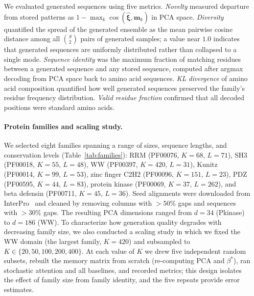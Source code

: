 We evaluated generated sequences using five metrics. \emph{Novelty} measured departure from stored patterns as $1 - \max_k \cos(\hat{\boldsymbol{\xi}}, \mathbf{m}_k)$ in PCA space. \emph{Diversity} quantified the spread of the generated ensemble as the mean pairwise cosine distance among all $\binom{S}{2}$ pairs of generated samples; a value near $1.0$ indicates that generated sequences are uniformly distributed rather than collapsed to a single mode. \emph{Sequence identity} was the maximum fraction of matching residues between a generated sequence and any stored sequence, computed after argmax decoding from PCA space back to amino acid sequences. \emph{KL divergence} of amino acid composition quantified how well generated sequences preserved the family's residue frequency distribution. \emph{Valid residue fraction} confirmed that all decoded positions were standard amino acids.

\paragraph{Protein families and scaling study.}
We selected eight families spanning a range of sizes, sequence lengths, and conservation levels (Table~\ref{tab:families}): RRM (PF00076, $K{=}68$, $L{=}71$), SH3 (PF00018, $K{=}55$, $L{=}48$), WW (PF00397, $K{=}420$, $L{=}31$), Kunitz (PF00014, $K{=}99$, $L{=}53$), zinc finger C2H2 (PF00096, $K{=}151$, $L{=}23$), PDZ (PF00595, $K{=}44$, $L{=}83$), protein kinase (PF00069, $K{=}37$, $L{=}262$), and beta defensin (PF00711, $K{=}45$, $L{=}36$). Seed alignments were downloaded from InterPro~\cite{mistryPfamProteinFamilies2021} and cleaned by removing columns with $>50\%$ gaps and sequences with $>30\%$ gaps. The resulting PCA dimensions ranged from $d{=}34$ (Pkinase) to $d{=}186$ (WW). To characterize how generation quality degrades with decreasing family size, we also conducted a scaling study in which we fixed the WW domain (the largest family, $K{=}420$) and subsampled to $K \in \{20, 50, 100, 200, 400\}$. At each value of $K$ we drew five independent random subsets, rebuilt the memory matrix from scratch (re-computing PCA and $\beta^*$), ran stochastic attention and all baselines, and recorded metrics; this design isolates the effect of family size from family identity, and the five repeats provide error estimates.

